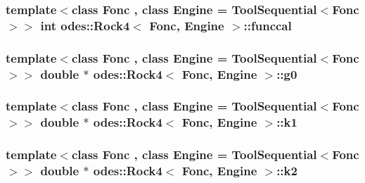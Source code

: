 \hypertarget{classodes_1_1Rock4_a268f70915136d0bb03f6262e3b341960}{
\subsubsection[{funccal}]{\setlength{\rightskip}{0pt plus 5cm}template$<$class Fonc , class Engine  = Tool\-Sequential$<$\-Fonc$>$$>$ int {\bf odes\-::\-Rock4}$<$ Fonc, Engine $>$\-::funccal\hspace{0.3cm}{\ttfamily [private]}}}\label{classodes_1_1Rock4_a268f70915136d0bb03f6262e3b341960}
\hypertarget{classodes_1_1Rock4_aeec7fd59c059466e1759178222ce678e}{
\subsubsection[{g0}]{\setlength{\rightskip}{0pt plus 5cm}template$<$class Fonc , class Engine  = Tool\-Sequential$<$\-Fonc$>$$>$ double $\ast$ {\bf odes\-::\-Rock4}$<$ Fonc, Engine $>$\-::g0\hspace{0.3cm}{\ttfamily [private]}}}\label{classodes_1_1Rock4_aeec7fd59c059466e1759178222ce678e}
\hypertarget{classodes_1_1Rock4_a608f2e818f5ff65f24e7fb38f054b4de}{
\subsubsection[{k1}]{\setlength{\rightskip}{0pt plus 5cm}template$<$class Fonc , class Engine  = Tool\-Sequential$<$\-Fonc$>$$>$ double $\ast$ {\bf odes\-::\-Rock4}$<$ Fonc, Engine $>$\-::k1\hspace{0.3cm}{\ttfamily [private]}}}\label{classodes_1_1Rock4_a608f2e818f5ff65f24e7fb38f054b4de}
\hypertarget{classodes_1_1Rock4_a7c9731b0de70405a4f14c0e8c5a8b498}{
\subsubsection[{k2}]{\setlength{\rightskip}{0pt plus 5cm}template$<$class Fonc , class Engine  = Tool\-Sequential$<$\-Fonc$>$$>$ double $\ast$ {\bf odes\-::\-Rock4}$<$ Fonc, Engine $>$\-::k2\hspace{0.3cm}{\ttfamily [private]}}}\label{classodes_1_1Rock4_a7c9731b0de70405a4f14c0e8c5a8b498}

